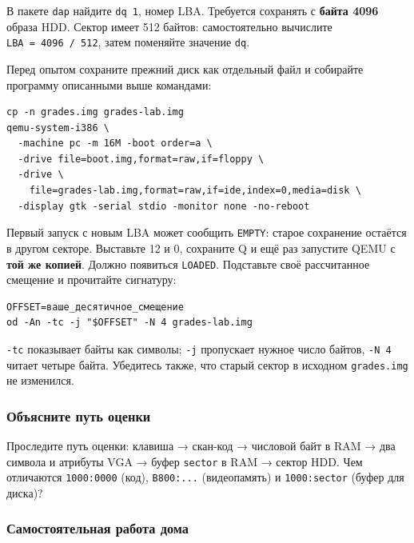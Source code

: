 В пакете \texttt{dap} найдите \texttt{dq\ 1}, номер LBA. Требуется
сохранять с \textbf{байта 4096} образа HDD. Сектор имеет 512 байтов:
самостоятельно вычислите \texttt{LBA\ =\ 4096\ /\ 512}, затем поменяйте
значение \texttt{dq}.

Перед опытом сохраните прежний диск как отдельный файл и собирайте
программу описанными выше командами:

\begin{verbatim}
cp -n grades.img grades-lab.img
qemu-system-i386 \
  -machine pc -m 16M -boot order=a \
  -drive file=boot.img,format=raw,if=floppy \
  -drive \
    file=grades-lab.img,format=raw,if=ide,index=0,media=disk \
  -display gtk -serial stdio -monitor none -no-reboot
\end{verbatim}

Первый запуск с новым LBA может сообщить \texttt{EMPTY}: старое
сохранение остаётся в другом секторе. Выставьте 12 и 0, сохраните Q и
ещё раз запустите QEMU с \textbf{той же копией}. Должно появиться
\texttt{LOADED}. Подставьте своё рассчитанное смещение и прочитайте
сигнатуру:

\begin{verbatim}
OFFSET=ваше_десятичное_смещение
od -An -tc -j "$OFFSET" -N 4 grades-lab.img
\end{verbatim}

\texttt{-tc} показывает байты как символы; \texttt{-j} пропускает нужное
число байтов, \texttt{-N\ 4} читает четыре байта. Убедитесь также, что
старый сектор в исходном \texttt{grades.img} не изменился.

\hypertarget{ux43eux431ux44aux44fux441ux43dux438ux442ux435-ux43fux443ux442ux44c-ux43eux446ux435ux43dux43aux438}{%
\subsubsection{Объясните путь
оценки}\label{ux43eux431ux44aux44fux441ux43dux438ux442ux435-ux43fux443ux442ux44c-ux43eux446ux435ux43dux43aux438}}

Проследите путь оценки: клавиша → скан-код → числовой байт в RAM → два
символа и атрибуты VGA → буфер \texttt{sector} в RAM → сектор HDD. Чем
отличаются \texttt{1000:0000} (код), \texttt{B800:...} (видеопамять) и
\texttt{1000:sector} (буфер для диска)?

\hypertarget{ux441ux430ux43cux43eux441ux442ux43eux44fux442ux435ux43bux44cux43dux430ux44f-ux440ux430ux431ux43eux442ux430-ux434ux43eux43cux430}{%
\subsubsection{Самостоятельная работа
дома}\label{ux441ux430ux43cux43eux441ux442ux43eux44fux442ux435ux43bux44cux43dux430ux44f-ux440ux430ux431ux43eux442ux430-ux434ux43eux43cux430}}

